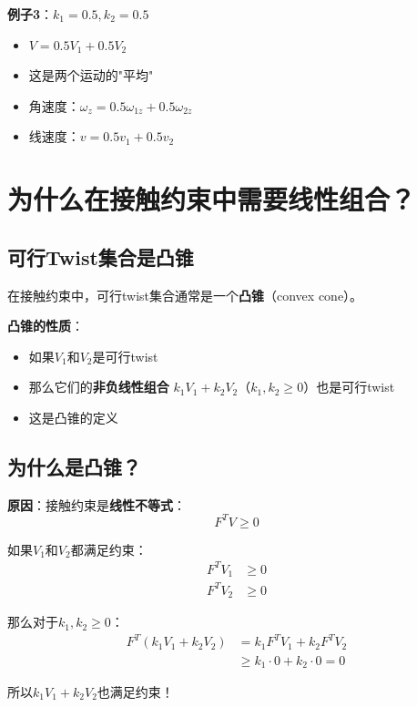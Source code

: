 \documentclass[12pt,a4paper]{article}
\begin{document}
\textbf{例子3}：$k_1 = 0.5, k_2 = 0.5$

\begin{itemize}
\item $V = 0.5 V_1 + 0.5 V_2$
\item 这是两个运动的"平均"
\item 角速度：$\omega_z = 0.5 \omega_{1z} + 0.5 \omega_{2z}$
\item 线速度：$v = 0.5 v_1 + 0.5 v_2$
\end{itemize}

\section{为什么在接触约束中需要线性组合？}

\subsection{可行Twist集合是凸锥}

在接触约束中，可行twist集合通常是一个\textbf{凸锥}（convex cone）。

\textbf{凸锥的性质}：
\begin{itemize}
\item 如果$V_1$和$V_2$是可行twist
\item 那么它们的\textbf{非负线性组合} $k_1 V_1 + k_2 V_2$（$k_1, k_2 \geq 0$）也是可行twist
\item 这是凸锥的定义
\end{itemize}

\subsection{为什么是凸锥？}

\textbf{原因}：接触约束是\textbf{线性不等式}：
\begin{equation}
F^T V \geq 0
\end{equation}

如果$V_1$和$V_2$都满足约束：
\begin{align}
F^T V_1 &\geq 0 \\
F^T V_2 &\geq 0
\end{align}

那么对于$k_1, k_2 \geq 0$：
\begin{align}
F^T (k_1 V_1 + k_2 V_2) &= k_1 F^T V_1 + k_2 F^T V_2 \\
&\geq k_1 \cdot 0 + k_2 \cdot 0 = 0
\end{align}

所以$k_1 V_1 + k_2 V_2$也满足约束！
\end{document}
